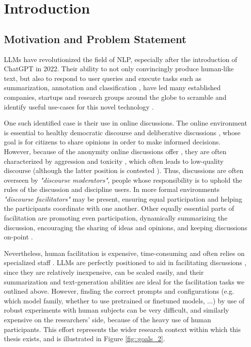 %
\chapter{Introduction}
\label{sec:intro}

\section{Motivation and Problem Statement}
\label{sec:intro:motivation}

\acp{LLM} have revolutionized the field of \ac{NLP}, especially after the introduction of ChatGPT in 2022. Their ability to not only convincingly produce human-like text, but also to respond to user queries and execute tasks such as summarization, annotation and classification \cite{ts2024, tan2024largelanguagemodelsdata}, have led many established companies, startups and research groups around the globe to scramble and identify useful use-cases for this novel technology \cite{HadiASO, Zhou2024LargeLM, Hutchinson2024LLMAssistedVA}.

One such identified case is their use in online discussions. The online environment is essential to  healthy democratic discourse \cite{WrightDemocracy, Janssen2005, Papacharissi2004DemocracyOC} and deliberative discussions \cite{small2021polis}, whose goal is for citizens to share opinions in order to make informed decisions. However, because of the anonymity online discussions offer \cite{Avalle2024PersistentIP}, they are often characterized by aggression and toxicity \cite{XiaToxicity}, which often leads to low-quality discourse \cite{WrightDemocracy} (although the latter position is contested \cite{Papacharissi2004DemocracyOC}). Thus, discussions are often overseen by \textit{"discourse moderators"}, people whose responsibility is to uphold the rules of the discussion and discipline users. In more formal environments \textit{"discourse facilitators"} may be present, ensuring equal participation and helping the participants coordinate with one another. Other equally essential parts of facilitation are promoting even participation, dynamically summarizing the discussion, encouraging the sharing of ideas and opinions, and keeping discussions on-point \cite{Harvard2024, Wang2008StudentfacilitatorsRI}.

Nevertheless, human facilitation is expensive, time-consuming and often relies on specialized staff \cite{small-polis-llm}. LLMs are perfectly positioned to aid in facilitating discussions \cite{small-polis-llm}, since they are relatively inexpensive, can be scaled easily, and their summarization and text-generation abilities are ideal for the facilitation tasks we outlined above. However, finding the correct prompts and configurations (e.g. which model family, whether to use pretrained or finetuned models, ...) by use of robust experiments with human subjects can be very difficult, and similarly expensive on the researchers' side, because of the heavy use of human participants. This effort represents the wider research context within which this thesis exists, and is illustrated in Figure \ref{fig::goals_2}.

